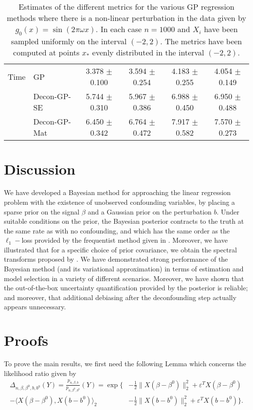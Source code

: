 \documentclass[11pt]{article}
\newcommand{\eps}{\varepsilon}
\numberwithin{equation}{section}
\begin{document}
\begin{table}
{\begin{tabular}{r|l|cccc}
Time     & GP       & 3.378  $\pm$  0.100& 3.594  $\pm$  0.254 & 4.183  $\pm$  0.255 & 4.054  $\pm$  0.149\\
         & Decon-GP-SE  & 5.744  $\pm$  0.310& 5.967  $\pm$  0.386 & 6.988  $\pm$  0.450 & 6.950  $\pm$  0.488\\
         & Decon-GP-Mat & 6.450  $\pm$  0.342& 6.764  $\pm$  0.472 & 7.917  $\pm$  0.582 & 7.570  $\pm$  0.273\\
\bottomrule
\end{tabular}
}
\caption{Estimates of the different metrics for the various GP regression methods where there is a non-linear perturbation in the data given by $g_0(x) = \sin(2 \pi \omega x)$. In each case $n = 1000$ and $X_i$ have been sampled uniformly on the interval $(-2, 2)$. The metrics have been computed at points $x_*$ evenly distributed in the interval $(-2, 2)$.}
\label{Tab:nl_perturbation}
\end{table}

\section{Discussion}
We have developed a Bayesian method for approaching the linear regression problem with the existence of unobserved confounding variables, by placing a sparse prior on the signal $\beta$ and a Gaussian prior on the perturbation $b$. Under suitable conditions on the prior, the Bayesian posterior contracts to the truth at the same rate as with no confounding, and which has the same order as the $\ell_1-$loss provided by the frequentist method given in \cite{CBM2020}. Moreover, we have illustrated that for a specific choice of prior covariance, we obtain the spectral transforms proposed by \cite{CBM2020}. We have demonstrated strong performance of the Bayesian method (and its variational approximation) in terms of estimation and model selection in a variety of different scenarios. Moreover, we have shown that the out-of-the-box uncertainty quantification provided by the posterior is reliable; and moreover, that additional debiasing after the deconfounding step actually appears unnecessary.




\appendix
\newpage
\section{Proofs}
To prove the main results, we first need the following Lemma which concerns the likelihood ratio given by
\begin{align*}
	\Delta_{n, \beta, \beta^0, b, b^0}(Y) = \frac{p_{n, \beta, b}}{p_{n, \beta^0, b^0}}(Y) = \exp\Big\{&-\frac{1}{2}\|X(\beta - \beta^0)\|_2^2 + \eps^TX(\beta - \beta^0) \\
 -\langle X(\beta - \beta^0), X(b - b^0)  \rangle_2	&-\frac{1}{2}\|X(b - b^0)\|_2^2 + \eps^TX(b - b^0) \Big\}.
\end{align*}
\end{document}
